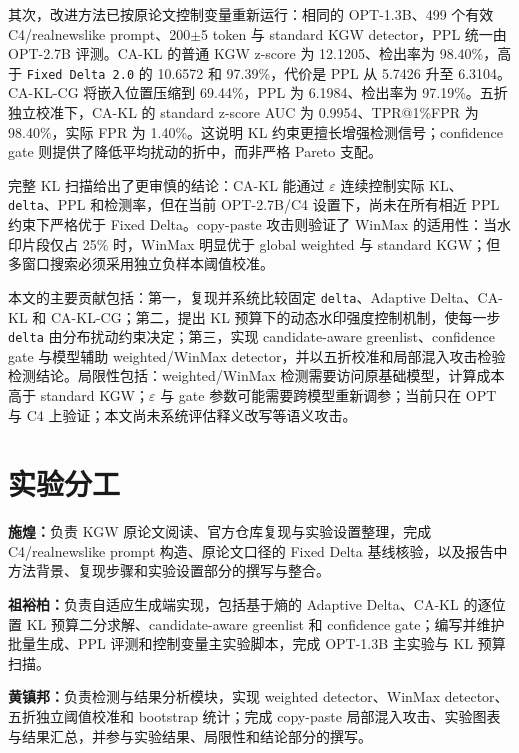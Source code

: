 \documentclass[a4paper,UTF8,zihao=5]{ctexart}
\newcommand{\method}{CA-KL}
\newcommand{\fullmethod}{CA-KL-CG}
\begin{document}
其次，改进方法已按原论文控制变量重新运行：相同的 OPT-1.3B、499 个有效 C4/realnewslike prompt、200$\pm$5 token 与 standard KGW detector，PPL 统一由 OPT-2.7B 评测。\method{} 的普通 KGW z-score 为 12.1205、检出率为 98.40\%，高于 \texttt{Fixed Delta 2.0} 的 10.6572 和 97.39\%，代价是 PPL 从 5.7426 升至 6.3104。\fullmethod{} 将嵌入位置压缩到 69.44\%，PPL 为 6.1984、检出率为 97.19\%。五折独立校准下，\method{} 的 standard z-score AUC 为 0.9954、TPR@1\%FPR 为 98.40\%，实际 FPR 为 1.40\%。这说明 KL 约束更擅长增强检测信号；confidence gate 则提供了降低平均扰动的折中，而非严格 Pareto 支配。

完整 KL 扫描给出了更审慎的结论：CA-KL 能通过 $\varepsilon$ 连续控制实际 KL、\texttt{delta}、PPL 和检测率，但在当前 OPT-2.7B/C4 设置下，尚未在所有相近 PPL 约束下严格优于 Fixed Delta。copy-paste 攻击则验证了 WinMax 的适用性：当水印片段仅占 25\% 时，WinMax 明显优于 global weighted 与 standard KGW；但多窗口搜索必须采用独立负样本阈值校准。

本文的主要贡献包括：第一，复现并系统比较固定 \texttt{delta}、Adaptive Delta、\method{} 和 \fullmethod{}；第二，提出 KL 预算下的动态水印强度控制机制，使每一步 \texttt{delta} 由分布扰动约束决定；第三，实现 candidate-aware greenlist、confidence gate 与模型辅助 weighted/WinMax detector，并以五折校准和局部混入攻击检验检测结论。局限性包括：weighted/WinMax 检测需要访问原基础模型，计算成本高于 standard KGW；$\varepsilon$ 与 gate 参数可能需要跨模型重新调参；当前只在 OPT 与 C4 上验证；本文尚未系统评估释义改写等语义攻击。

\section{实验分工}

\noindent\textbf{施煌：}负责 KGW 原论文阅读、官方仓库复现与实验设置整理，完成 C4/realnewslike prompt 构造、原论文口径的 Fixed Delta 基线核验，以及报告中方法背景、复现步骤和实验设置部分的撰写与整合。

\noindent\textbf{祖裕柏：}负责自适应生成端实现，包括基于熵的 Adaptive Delta、CA-KL 的逐位置 KL 预算二分求解、candidate-aware greenlist 和 confidence gate；编写并维护批量生成、PPL 评测和控制变量主实验脚本，完成 OPT-1.3B 主实验与 KL 预算扫描。

\noindent\textbf{黄镇邦：}负责检测与结果分析模块，实现 weighted detector、WinMax detector、五折独立阈值校准和 bootstrap 统计；完成 copy-paste 局部混入攻击、实验图表与结果汇总，并参与实验结果、局限性和结论部分的撰写。


\clearpage


\end{document}
